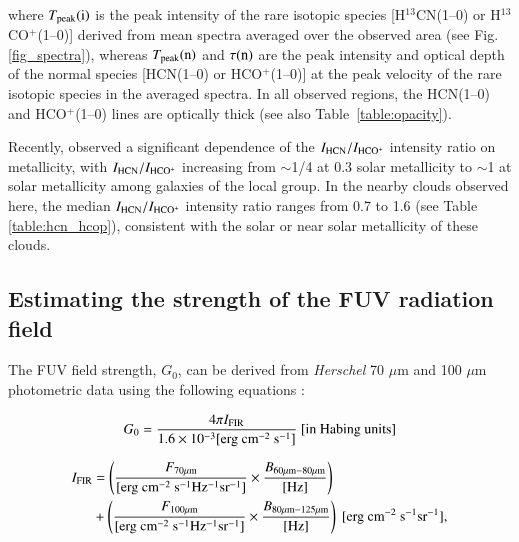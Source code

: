 \documentclass{aa}
\begin{document}
{\noindent where $T_{\rm peak}({\rm i})$ is the peak intensity of the rare isotopic species [H$^{13}$CN(1--0) or H$^{13}$CO$^{+}$(1--0)] derived from mean spectra averaged over the observed area (see Fig. \ref{fig_spectra}), whereas $T_{\rm peak}({\rm n)}$ and $\tau({\rm n})$ are the peak intensity and optical depth of the normal species [HCN(1--0) or HCO$^{+}$(1--0)] 
at the peak velocity of the rare isotopic species in the averaged spectra. 
In all observed regions, the HCN(1--0) and HCO$^+$(1--0) lines are optically thick (see also Table~\ref{table:opacity}).




Recently, \citet{Brain16} observed a significant dependence of the $I_{\rm HCN}/I_{\rm HCO^+}$ intensity ratio on metallicity, 
with $I_{\rm HCN}/I_{\rm HCO^+}$ increasing from $\sim$1/4 at 0.3 solar metallicity to $\sim$1 at solar metallicity 
among galaxies of the local group.
In the nearby clouds observed here, the median $I_{\rm HCN}/I_{\rm HCO^+}$ intensity ratio ranges 
from 0.7 to 1.6 (see Table \ref{table:hcn_hcop}), consistent with the solar or near solar metallicity of these clouds.




\subsection{Estimating the strength of the FUV radiation field }\label{ap:FUV}

 The FUV field strength, $G_0$, can be derived from {\it Herschel} 70 $\mu$m and 100 $\mu$m photometric data using the following equations
\citep{Kramer08, Schneider16}: 

\begin{equation}\label{eq:G0_FIR}
G_0 = \frac{4\pi I_{\rm FIR}} {1.6\times 10^{-3} [{\rm erg\ cm^{-2}\ s^{-1}}]} \ [{\rm in\ Habing\ units}]
\end{equation}

\begin{equation}\label{eq:G0_IFIR}
\begin{split}
I_{\rm FIR} &= \left(\frac{F_{\rm 70 \mu m}}{{[{\rm erg\ cm^{-2}\ s^{-1} Hz^{-1} sr^{-1}}}]} \times \frac{B_{\rm 60 \mu m - 80 \mu m}}{{\rm [Hz]}}  \right) \\ 
&+ \left(\frac{F_{\rm 100 \mu m}}{{[{\rm erg\ cm^{-2}\ s^{-1} Hz^{-1} sr^{-1}}]}} \times \frac{B_{\rm 80 \mu m - 125 \mu m}}{{\rm [Hz]}}  \right) \ [{\rm erg\ cm^{-2}\ s^{-1} sr^{-1}}],
\end{split}
\end{equation}

}
\end{document}
